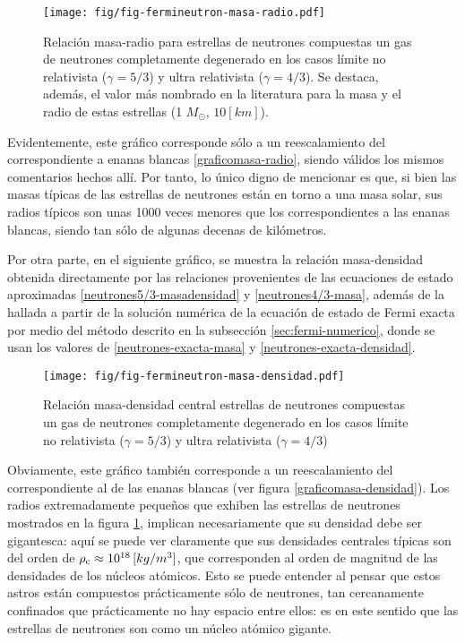 \begin{figure}[H]
\centering
\texttt{[image: fig/fig-fermineutron-masa-radio.pdf]}
\caption{Relación masa-radio para estrellas de neutrones compuestas un gas de neutrones completamente degenerado en los casos límite no relativista ($\gamma=5/3$) y ultra relativista ($\gamma=4/3$). Se destaca, además, el valor más nombrado en la literatura para la masa y el radio de estas estrellas (1 $M_\odot$, $10[km]$).}\label{graficomasa-radio-neutrones}
\end{figure}

Evidentemente, este gráfico corresponde sólo a un reescalamiento del correspondiente a enanas blancas \ref{graficomasa-radio}, siendo válidos los mismos comentarios hechos allí. Por tanto, lo único digno de mencionar es que, si bien las masas típicas de las estrellas de neutrones están en torno a una masa solar, sus radios típicos son unas 1000 veces menores que los correspondientes a las enanas blancas, siendo tan sólo de algunas decenas de kilómetros.

Por otra parte, en el siguiente gráfico, se muestra la relación masa-densidad obtenida directamente por las relaciones provenientes de las ecuaciones de estado aproximadas \eqref{neutrones5/3-masadensidad} y \eqref{neutrones4/3-masa}, además de la hallada a partir de la solución numérica de la ecuación de estado de Fermi exacta por medio del método descrito en la subsección \ref{sec:fermi-numerico}, donde se usan los valores de \eqref{neutrones-exacta-masa} y \eqref{neutrones-exacta-densidad}.

\begin{figure}[H]
\centering
\texttt{[image: fig/fig-fermineutron-masa-densidad.pdf]}
\caption{Relación masa-densidad central estrellas de neutrones compuestas un gas de neutrones completamente degenerado en los casos límite no relativista ($\gamma=5/3$) y ultra relativista ($\gamma=4/3$)}\label{graficomasa-densidad-neutrones}
\end{figure}

Obviamente, este gráfico también corresponde a un reescalamiento del correspondiente al de las enanas blancas (ver figura \ref{graficomasa-densidad}). Los radios extremadamente peque\~nos que exhiben las estrellas de neutrones mostrados en la figura \ref{graficomasa-radio-neutrones}, implican necesariamente que su densidad debe ser gigantesca: aquí se puede ver claramente que sus densidades centrales típicas son del orden de $\rho_{\rm c}\approx10^{18}\,[kg/m^3]$, que corresponden al orden de magnitud de las densidades de los núcleos atómicos. Esto se puede entender al pensar que estos astros están compuestos prácticamente sólo de neutrones, tan cercanamente confinados que prácticamente no hay espacio entre ellos: es en este sentido que las estrellas de neutrones son como un núcleo atómico gigante.


